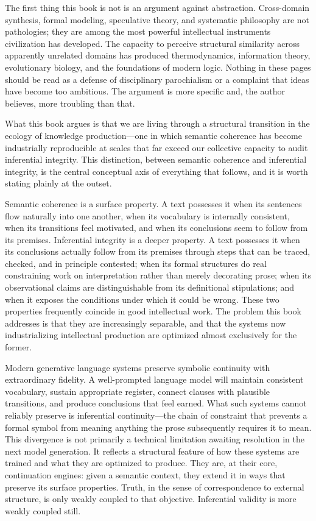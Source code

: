 \documentclass[12pt, openright, twoside]{book}
\begin{document}
The first thing this book is not is an argument against abstraction. Cross-domain
synthesis, formal modeling, speculative theory, and systematic philosophy are not
pathologies; they are among the most powerful intellectual instruments civilization
has developed. The capacity to perceive structural similarity across apparently
unrelated domains has produced thermodynamics, information theory, evolutionary
biology, and the foundations of modern logic. Nothing in these pages should be read
as a defense of disciplinary parochialism or a complaint that ideas have become too
ambitious. The argument is more specific and, the author believes, more troubling than
that.

What this book argues is that we are living through a structural transition in the
ecology of knowledge production---one in which semantic coherence has become
industrially reproducible at scales that far exceed our collective capacity to audit
inferential integrity. This distinction, between semantic coherence and inferential
integrity, is the central conceptual axis of everything that follows, and it is
worth stating plainly at the outset.

Semantic coherence is a surface property. A text possesses it when its sentences flow
naturally into one another, when its vocabulary is internally consistent, when its
transitions feel motivated, and when its conclusions seem to follow from its
premises. Inferential integrity is a deeper property. A text possesses it when
its conclusions actually follow from its premises through steps that can be traced,
checked, and in principle contested; when its formal structures do real constraining
work on interpretation rather than merely decorating prose; when its observational
claims are distinguishable from its definitional stipulations; and when it exposes
the conditions under which it could be wrong. These two properties frequently
coincide in good intellectual work. The problem this book addresses is that they
are increasingly separable, and that the systems now industrializing intellectual
production are optimized almost exclusively for the former.

Modern generative language systems preserve symbolic continuity with extraordinary
fidelity. A well-prompted language model will maintain consistent vocabulary,
sustain appropriate register, connect clauses with plausible transitions, and
produce conclusions that feel earned. What such systems cannot reliably preserve
is inferential continuity---the chain of constraint that prevents a formal symbol
from meaning anything the prose subsequently requires it to mean. This divergence
is not primarily a technical limitation awaiting resolution in the next model
generation. It reflects a structural feature of how these systems are trained and
what they are optimized to produce. They are, at their core, continuation engines:
given a semantic context, they extend it in ways that preserve its surface
properties. Truth, in the sense of correspondence to external structure, is only
weakly coupled to that objective. Inferential validity is more weakly coupled still.
\end{document}

